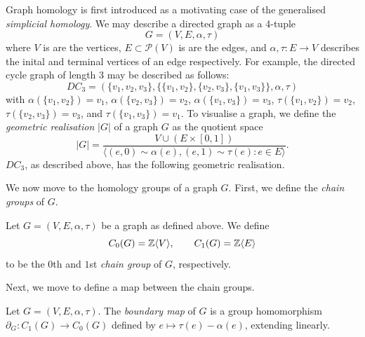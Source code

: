 Graph homology is first introduced as a motivating case of the generalised \emph{simplicial homology}.
We may describe a directed graph as a 4-tuple
\[ G = (V, E, \alpha, \tau) \]
where $V$ is are the vertices, $E \subset \mathcal P(V)$ is are the edges, and $\alpha, \tau: E \to V$ describes the inital and terminal vertices of an edge respectively.
For example, the directed cycle graph of length 3 may be described as follows:
\[ DC_3 = (\{v_1, v_2, v_3\}, \{\{v_1, v_2\}, \{v_2, v_3\}, \{v_1, v_3\}\}, \alpha, \tau) \]
with $\alpha(\{v_1, v_2\}) = v_1$, $\alpha(\{v_2, v_3\}) = v_2$, $\alpha(\{v_1, v_3\}) = v_3$, $\tau(\{v_1, v_2\}) = v_2$, $\tau(\{v_2, v_3\}) = v_3$, and $\tau(\{v_1, v_3\}) = v_1$.
To visualise a graph, we define the \emph{geometric realisation} $\lvert G \rvert$ of a graph $G$ as the quotient space
\[
  \lvert G \rvert = \frac{V \cup (E \times [0,1])}{\langle (e,0) \sim \alpha(e), (e,1) \sim \tau(e): e \in E  \rangle}.
\]
$DC_3$, as described above, has the following geometric realisation.

\begin{center}
\end{center}

We now move to the homology groups of a graph $G$. First, we define the \emph{chain groups} of $G$.

\begin{definition}
  Let $G = (V, E, \alpha, \tau)$ be a graph as defined above. We define
  \[
    C_0(G) = \mathbb{Z}\langle V \rangle, \qquad
    C_1(G) = \mathbb{Z}\langle E \rangle
  \]
  to be the $0$th and $1$st \emph{chain group} of $G$, respectively.
\end{definition}

Next, we move to define a map between the chain groups.

\begin{definition}
  Let $G = (V,E, \alpha, \tau)$. The \emph{boundary map} of $G$ is a group homomorphism $\partial_G: C_1(G) \to C_0(G)$ defined by $e \mapsto \tau(e) - \alpha(e)$, extending linearly.
\end{definition}

